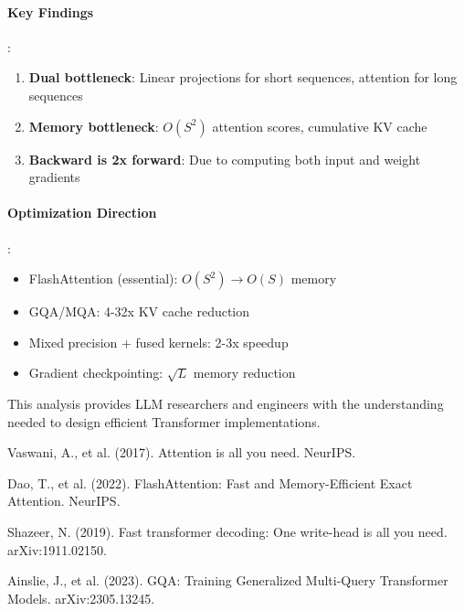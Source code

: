 \documentclass[10pt]{article}
\begin{document}
\paragraph{Key Findings}:
\begin{enumerate}
  \item \textbf{Dual bottleneck}: Linear projections for short sequences, attention for long sequences
  \item \textbf{Memory bottleneck}: $O(S^2)$ attention scores, cumulative KV cache
  \item \textbf{Backward is 2x forward}: Due to computing both input and weight gradients
\end{enumerate}

\paragraph{Optimization Direction}:
\begin{itemize}
  \item FlashAttention (essential): $O(S^2) \rightarrow O(S)$ memory
  \item GQA/MQA: 4-32x KV cache reduction
  \item Mixed precision + fused kernels: 2-3x speedup
  \item Gradient checkpointing: $\sqrt{L}$ memory reduction
\end{itemize}

This analysis provides LLM researchers and engineers with the understanding needed to design efficient Transformer implementations.

\begin{thebibliography}{99}

Vaswani, A., et al. (2017). Attention is all you need. NeurIPS.

Dao, T., et al. (2022). FlashAttention: Fast and Memory-Efficient Exact Attention. NeurIPS.

Shazeer, N. (2019). Fast transformer decoding: One write-head is all you need. arXiv:1911.02150.

Ainslie, J., et al. (2023). GQA: Training Generalized Multi-Query Transformer Models. arXiv:2305.13245.

\end{thebibliography}
\end{document}
